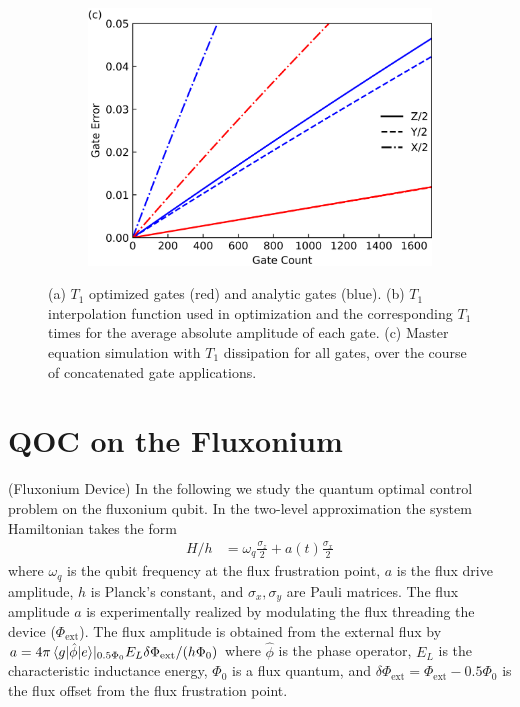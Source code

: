 \documentclass[
  amsfonts,
  amsmath,
  tbtags,
  amssymb,
  aps,
  nobibnotes,
  twocolumn,
]{revtex4-2}
\begin{document}
\begin{figure}[ht]
  \begin{subfigure}{\linewidth}
    \includegraphics[width=\linewidth]{assets/f1c.png}
  \end{subfigure}
  \caption{
    (a) $T_{1}$ optimized gates (red) and analytic gates (blue).
    (b) $T_{1}$ interpolation function used in optimization
    and the corresponding $T_{1}$ times for the average absolute amplitude of each gate.
    (c) Master equation simulation with $T_{1}$ dissipation
    for all gates, over the course of concatenated gate applications.
  }
\end{figure}


\section{QOC on the Fluxonium}
(Fluxonium Device) In the following we study
the quantum optimal control problem on the fluxonium qubit.
In the two-level
approximation the system Hamiltonian takes the form
\label{eq:hamiltonian}
\begin{align}
  H/h &= \omega_{q} \frac{\sigma_{z}}{2} + a(t) \frac{\sigma_{x}}{2}
\end{align}
where $\omega_{q}$ is the qubit frequency at the flux frustration point,
$a$ is the flux drive amplitude, $h$ is Planck's constant, and $\sigma_{x}, \sigma_{y}$
are Pauli matrices. The flux amplitude $a$ is experimentally
realized by modulating the flux 
threading the device ($\Phi_{\textrm{ext}}$).
The flux amplitude is obtained from the external flux by
$a = 4 \pi \braket{g \lvert \hat{\phi} \rvert e} \rvert_{0.5 \Phi_{0}} E_{L}
\delta \Phi_{\textrm{ext}} / (h \Phi_{0})$
where $\hat{\phi}$ is the phase operator, $E_{L}$ is the characteristic inductance energy, $\Phi_{0}$
is a flux quantum, and
$\delta \Phi_{\textrm{ext}} = \Phi_{\textrm{ext}} - 0.5 \Phi_{0}$ is the flux
offset from the flux frustration point.
\end{document}

